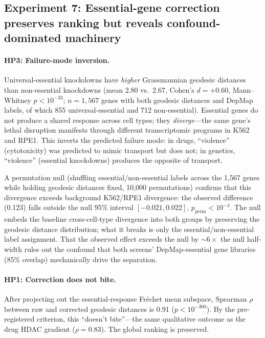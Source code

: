 \documentclass{article}
\begin{document}
\subsection{Experiment 7: Essential-gene correction preserves ranking but reveals confound-dominated machinery}

\paragraph{HP3: Failure-mode inversion.}
Universal-essential knockdowns have \emph{higher} Grassmannian geodesic
distances than non-essential knockdowns (mean 2.80 vs.\ 2.67, Cohen's $d =
+0.60$, Mann--Whitney $p < 10^{-33}$; $n = 1{,}567$ genes with both
geodesic distances and DepMap labels, of which 855 universal-essential and
712 non-essential). Essential genes do not produce a shared response across
cell types; they \emph{diverge}---the same gene's lethal disruption
manifests through different transcriptomic programs in K562 and RPE1. This
inverts the predicted failure mode: in drugs, ``violence'' (cytotoxicity) was
predicted to mimic transport but does not; in genetics, ``violence''
(essential knockdowns) produces the opposite of transport.

A permutation null (shuffling essential/non-essential labels across the
1{,}567 genes while holding geodesic distances fixed, 10{,}000 permutations)
confirms that this divergence exceeds background K562/RPE1 divergence:
the observed difference (0.123) falls outside the null 95\% interval
$[-0.021, 0.022]$, $p_{\text{perm}} < 10^{-4}$. The null embeds the baseline
cross-cell-type divergence into both groups by preserving the geodesic
distance distribution; what it breaks is only the essential/non-essential
label assignment. That the observed effect exceeds the null by ${\sim}6\times$
the null half-width rules out the confound that both screens' DepMap-essential
gene libraries (85\% overlap) mechanically drive the separation.

\paragraph{HP1: Correction does not bite.}
After projecting out the essential-response Fr\'echet mean subspace,
Spearman $\rho$ between raw and corrected geodesic distances is 0.91 ($p <
10^{-300}$). By the pre-registered criterion, this ``doesn't bite''---the
same qualitative outcome as the drug HDAC gradient ($\rho = 0.83$).
The global ranking is preserved.
\end{document}
